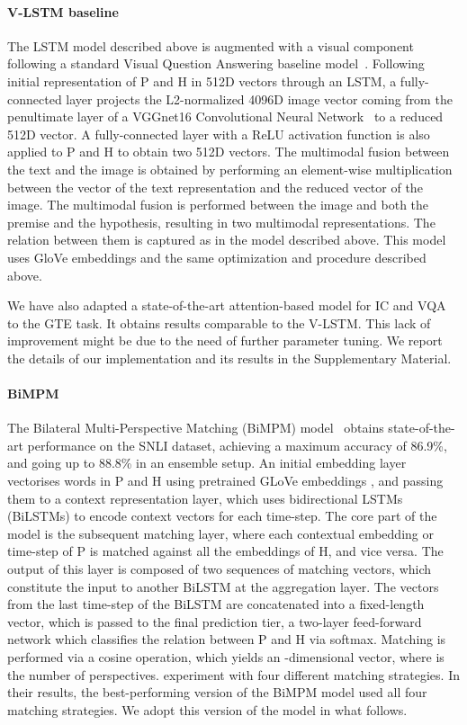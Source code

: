 \documentclass[11pt]{article}
\begin{document}
\paragraph{V-LSTM baseline} The LSTM model described above is
augmented with a visual component following a standard Visual Question Answering baseline model~\cite{anto:vqa15}.  
Following initial representation of P and H in 512D vectors through an LSTM,
a fully-connected layer projects the L2-normalized 4096D image vector coming from the penultimate layer of a VGGnet16
Convolutional Neural Network~ \cite{simonyan2014:vggnet} to a reduced 512D vector.
A fully-connected layer with a ReLU activation function is also applied to P and H
to obtain two 512D vectors. 
The multimodal fusion between the text and the image is obtained
by performing an element-wise multiplication between the
vector of the text representation and the reduced vector of the
image. The multimodal fusion is performed between the image and both the premise and the hypothesis, resulting in two multimodal representations. The relation between them is captured as in the model described above. This model uses GloVe embeddings and the same optimization and procedure described above.

We have also adapted a state-of-the-art attention-based model for IC and VQA~\cite{Anderson2017up-down,teney2017:tips} to the GTE task. It obtains results comparable to the V-LSTM. This lack of improvement might be due to the need of
  further parameter tuning. We report the details of  our implementation
  and its results in the Supplementary Material.

\paragraph{BiMPM}
The Bilateral Multi-Perspective Matching (BiMPM) model~\cite{Wang2017} obtains state-of-the-art performance on the SNLI dataset, achieving a maximum
accuracy of 86.9\%, and going up to 88.8\% in an ensemble setup.
An initial embedding layer vectorises words in P and H using pretrained GLoVe embeddings \cite{Pennington2014}, and passing them to a context representation layer, which uses bidirectional LSTMs (BiLSTMs) to encode context vectors for each time-step. The core part of the model is the subsequent matching layer, where each contextual embedding or time-step of P is matched against all the embeddings of H, and vice versa.
The output of this layer is composed of two sequences of matching vectors, which constitute the input to another BiLSTM at the aggregation layer. The vectors from the last time-step of the BiLSTM are concatenated into a fixed-length vector, which is passed to the final prediction tier, a two-layer feed-forward network which classifies the relation between P and H via softmax.
Matching is performed via a cosine operation, which yields an -dimensional vector, where  is the number of perspectives.  experiment with four different matching strategies.
In their results, the best-performing version of the BiMPM model used all four matching strategies. We adopt this version of the model in what follows.
\end{document}

